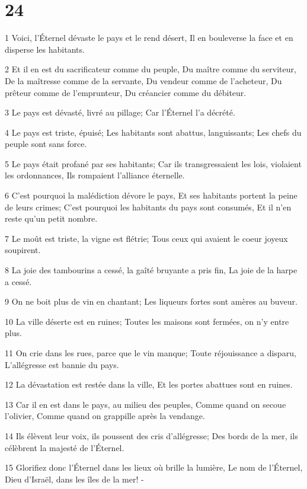 \chapter{24}

\par 1 Voici, l'Éternel dévaste le pays et le rend désert, Il en bouleverse la face et en disperse les habitants.
\par 2 Et il en est du sacrificateur comme du peuple, Du maître comme du serviteur, De la maîtresse comme de la servante, Du vendeur comme de l'acheteur, Du prêteur comme de l'emprunteur, Du créancier comme du débiteur.
\par 3 Le pays est dévasté, livré au pillage; Car l'Éternel l'a décrété.
\par 4 Le pays est triste, épuisé; Les habitants sont abattus, languissants; Les chefs du peuple sont sans force.
\par 5 Le pays était profané par ses habitants; Car ils transgressaient les lois, violaient les ordonnances, Ils rompaient l'alliance éternelle.
\par 6 C'est pourquoi la malédiction dévore le pays, Et ses habitants portent la peine de leurs crimes; C'est pourquoi les habitants du pays sont consumés, Et il n'en reste qu'un petit nombre.
\par 7 Le moût est triste, la vigne est flétrie; Tous ceux qui avaient le coeur joyeux soupirent.
\par 8 La joie des tambourins a cessé, la gaîté bruyante a pris fin, La joie de la harpe a cessé.
\par 9 On ne boit plus de vin en chantant; Les liqueurs fortes sont amères au buveur.
\par 10 La ville déserte est en ruines; Toutes les maisons sont fermées, on n'y entre plus.
\par 11 On crie dans les rues, parce que le vin manque; Toute réjouissance a disparu, L'allégresse est bannie du pays.
\par 12 La dévastation est restée dans la ville, Et les portes abattues sont en ruines.
\par 13 Car il en est dans le pays, au milieu des peuples, Comme quand on secoue l'olivier, Comme quand on grappille après la vendange.
\par 14 Ils élèvent leur voix, ils poussent des cris d'allégresse; Des bords de la mer, ils célèbrent la majesté de l'Éternel.
\par 15 Glorifiez donc l'Éternel dans les lieux où brille la lumière, Le nom de l'Éternel, Dieu d'Israël, dans les îles de la mer! -

